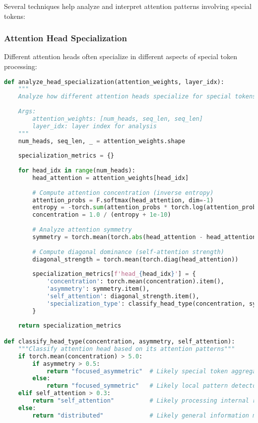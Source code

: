 Several techniques help analyze and interpret attention patterns involving special tokens:

\subsubsection{Attention Head Specialization}

Different attention heads often specialize in different aspects of special token processing:

\begin{lstlisting}[language=Python, caption=Attention head specialization analysis]
def analyze_head_specialization(attention_weights, layer_idx):
    """
    Analyze how different attention heads specialize for special tokens
    
    Args:
        attention_weights: [num_heads, seq_len, seq_len]
        layer_idx: layer index for analysis
    """
    num_heads, seq_len, _ = attention_weights.shape
    
    specialization_metrics = {}
    
    for head_idx in range(num_heads):
        head_attention = attention_weights[head_idx]
        
        # Compute attention concentration (inverse entropy)
        attention_probs = F.softmax(head_attention, dim=-1)
        entropy = -torch.sum(attention_probs * torch.log(attention_probs + 1e-10), dim=-1)
        concentration = 1.0 / (entropy + 1e-10)
        
        # Analyze attention symmetry
        symmetry = torch.mean(torch.abs(head_attention - head_attention.T))
        
        # Compute diagonal dominance (self-attention strength)
        diagonal_strength = torch.mean(torch.diag(head_attention))
        
        specialization_metrics[f'head_{head_idx}'] = {
            'concentration': torch.mean(concentration).item(),
            'asymmetry': symmetry.item(),
            'self_attention': diagonal_strength.item(),
            'specialization_type': classify_head_type(concentration, symmetry, diagonal_strength)
        }
    
    return specialization_metrics

def classify_head_type(concentration, asymmetry, self_attention):
    """Classify attention head based on its attention patterns"""
    if torch.mean(concentration) > 5.0:
        if asymmetry > 0.5:
            return "focused_asymmetric"  # Likely special token aggregator
        else:
            return "focused_symmetric"   # Likely local pattern detector
    elif self_attention > 0.3:
        return "self_attention"          # Likely processing internal representations
    else:
        return "distributed"             # Likely general information mixing
\end{lstlisting}


